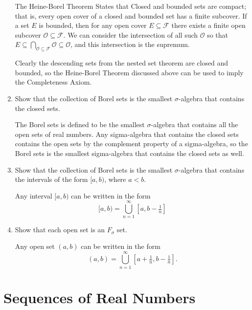 \begin{enumerate}
	The Heine-Borel Theorem States that Closed and bounded sets are compact; that is, every open cover of a closed and bounded set has a finite subcover.
	If a set $E$ is bounded, then for any open cover $E \subseteq \mathcal{F}$ there exists a finite open subcover $\mathcal{O} \subseteq \mathcal{F}$. 
	We can consider the intersection of all such $\mathcal{O}$ so that $E \subseteq \bigcap_{\mathcal{O} \subseteq \mathcal{F}} \mathcal{O} \subseteq \mathcal{O}$, and this intersection is the supremum. 
	\par
	Clearly the descending sets from the nested set theorem are closed and bounded, so the Heine-Borel Theorem discussed above can be used to imply the Completeness Axiom.
	\item Show that the collection of Borel sets is the smallest $\sigma$-algebra that contains the closed sets.\par
	The Borel sets is defined to be the smallest $\sigma$-algebra that contains all the open sets of real numbers.
	Any sigma-algebra that contains the closed sets contains the open sets by the complement property of a sigma-algebra, so the Borel sets is the smallest sigma-algebra that contains the closed sets as well. 
	\item Show that the collection of Borel sets is the smallest $\sigma$-algebra that contains the intervals of the form $[a,b)$, where $a<b.$\par
	Any interval $[a,b)$ can be written in the form
	\[
	[a,b) = \bigcup_{n=1}^\infty [a,b-\tfrac{1}{n}]	
	\] 
	\item Show that each open set is an $F_{\sigma}$ set.\par
	Any open set $(a,b)$ can be written in the form
	\[
		(a,b) = \bigcup_{n=1}^\infty [a+\tfrac{1}{n},b-\tfrac{1}{n}].	
	\] 
\end{enumerate}

\section{Sequences of Real Numbers}

